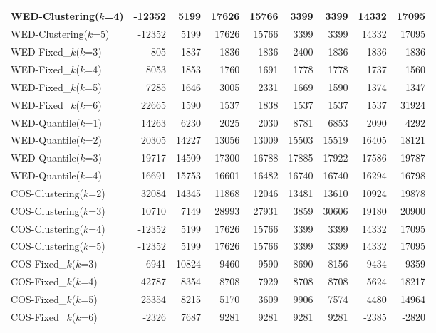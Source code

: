 \begin{table*}[ht]
{\begin{tabular}{|l|r|r|r|r|r|r|r|r|}
        WED-Clustering($k$=4) & -12352  & 5199  & 17626  & 15766  & 3399  & 3399  & 14332  & 17095  \\ \hline
        WED-Clustering($k$=5) & -12352  & 5199  & 17626  & 15766  & 3399  & 3399  & 14332  & 17095  \\ \hline
        WED-Fixed\_$k$($k$=3) & 805  & 1837  & 1836  & 1836  & 2400  & 1836  & 1836  & 1836  \\ \hline
        WED-Fixed\_$k$($k$=4) & 8053  & 1853  & 1760  & 1691  & 1778  & 1778  & 1737  & 1560  \\ \hline
        WED-Fixed\_$k$($k$=5) & 7285  & 1646  & 3005  & 2331  & 1669  & 1590  & 1374  & 1347  \\ \hline
        WED-Fixed\_$k$($k$=6) & 22665  & 1590  & 1537  & 1838  & 1537  & 1537  & 1537  & 31924  \\ \hline
        WED-Quantile($k$=1) & 14263  & 6230  & 2025  & 2030  & 8781  & 6853  & 2090  & 4292  \\ \hline
        WED-Quantile($k$=2) & 20305  & 14227  & 13056  & 13009  & 15503  & 15519  & 16405  & 18121  \\ \hline
        WED-Quantile($k$=3) & 19717  & 14509  & 17300  & 16788  & 17885  & 17922  & 17586  & 19787  \\ \hline
        WED-Quantile($k$=4) & 16691  & 15753  & 16601  & 16482  & 16740  & 16740  & 16294  & 16798  \\ \hline
        COS-Clustering($k$=2) & 32084  & 14345  & 11868  & 12046  & 13481  & 13610  & 10924  & 19878  \\ \hline
        COS-Clustering($k$=3) & 10710  & 7149  & 28993  & 27931  & 3859  & 30606  & 19180  & 20900  \\ \hline
        COS-Clustering($k$=4) & -12352  & 5199  & 17626  & 15766  & 3399  & 3399  & 14332  & 17095  \\ \hline
        COS-Clustering($k$=5) & -12352  & 5199  & 17626  & 15766  & 3399  & 3399  & 14332  & 17095  \\ \hline
        COS-Fixed\_$k$($k$=3) & 6941  & 10824  & 9460  & 9590  & 8690  & 8156  & 9434  & 9359  \\ \hline
        COS-Fixed\_$k$($k$=4) & 42787  & 8354  & 8708  & 7929  & 8708  & 8708  & 5624  & 18217  \\ \hline
        COS-Fixed\_$k$($k$=5) & 25354  & 8215  & 5170  & 3609  & 9906  & 7574  & 4480  & 14964  \\ \hline
        COS-Fixed\_$k$($k$=6) & -2326  & 7687  & 9281  & 9281  & 9281  & 9281  & -2385  & -2820  \\ \hline

\end{tabular}}
\end{table*}
